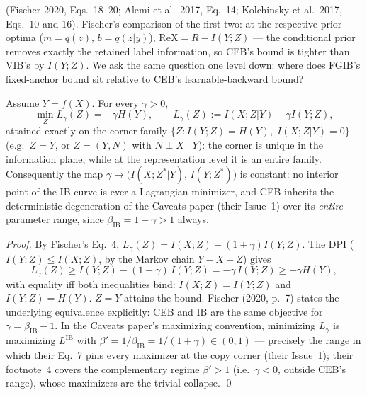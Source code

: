 (Fischer 2020, Eqs.~18--20; Alemi et al.\ 2017, Eq.~14; Kolchinsky et al.\ 2017,
Eqs.~10 and 16). Fischer's comparison of the first two: at the respective prior optima
($m = q(z)$, $b = q(z|y)$), $\mathrm{ReX} = R - I(Y;Z)$ --- the conditional prior removes
exactly the retained label information, so CEB's bound is tighter than VIB's by
$I(Y;Z)$. We ask the same question one level down: where does FGIB's fixed-anchor bound
sit relative to CEB's learnable-backward bound?

\begin{proposition}\label{prop:dead}
Assume $Y = f(X)$. For every $\gamma > 0$,
\begin{equation}
\min_Z L_\gamma(Z) = -\gamma H(Y),
\qquad
L_\gamma(Z) := I(X;Z|Y) - \gamma I(Y;Z),
\label{eq:min}
\end{equation}
attained exactly on the corner family
$\{Z : I(Y;Z) = H(Y),\; I(X;Z|Y) = 0\}$ (e.g.\ $Z = Y$, or $Z = (Y, N)$ with
$N \perp X \mid Y$): the corner is unique in the information plane, while at the
representation level it is an entire family. Consequently the map
$\gamma \mapsto \big(I(X;Z^*|Y),\, I(Y;Z^*)\big)$ is constant: no interior point of the
IB curve is ever a Lagrangian minimizer, and CEB inherits the deterministic degeneration
of the Caveats paper (their Issue~1) over its \emph{entire} parameter range, since
$\beta_{\mathrm{IB}} = 1 + \gamma > 1$ always.
\end{proposition}

\begin{proof}
By Fischer's Eq.~4, $L_\gamma(Z) = I(X;Z) - (1+\gamma)I(Y;Z)$. The DPI
($I(Y;Z) \le I(X;Z)$, by the Markov chain $Y - X - Z$) gives
\begin{equation}
L_\gamma(Z) \ge I(Y;Z) - (1+\gamma)\,I(Y;Z)
= -\gamma\,I(Y;Z) \ge -\gamma H(Y),
\label{eq:chain}
\end{equation}
with equality iff both inequalities bind: $I(X;Z) = I(Y;Z)$ and $I(Y;Z) = H(Y)$.
$Z = Y$ attains the bound. Fischer (2020, p.~7) states the underlying equivalence
explicitly: CEB and IB are the same objective for $\gamma = \beta_{\mathrm{IB}} - 1$.
In the Caveats paper's maximizing convention, minimizing $L_\gamma$ is maximizing
$L^{\mathrm{IB}}$ with $\beta' = 1/\beta_{\mathrm{IB}} = 1/(1+\gamma) \in (0,1)$ ---
precisely the range in which their Eq.~7 pins every maximizer at the copy corner (their
Issue~1); their footnote~4 covers the complementary regime $\beta' > 1$ (i.e.\
$\gamma < 0$, outside CEB's range), whose maximizers are the trivial collapse. \hfill\qed
\end{proof}

